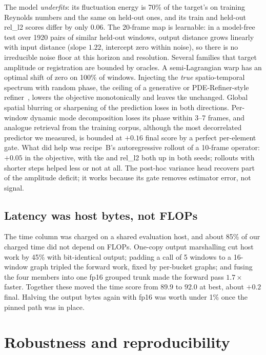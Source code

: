 \documentclass[10pt]{article}
\begin{document}
The model \emph{underfits}: its fluctuation energy is 70\% of the target's on training Reynolds numbers and the same on held-out ones, and its train and held-out rel\_l2 scores differ by only $0.06$. The 20-frame map is learnable: in a model-free test over 1920 pairs of similar held-out windows, output distance grows linearly with input distance (slope $1.22$, intercept zero within noise), so there is no irreducible noise floor at this horizon and resolution. Several families that target amplitude or registration are bounded by oracles. A semi-Lagrangian warp has an optimal shift of zero on 100\% of windows. Injecting the \emph{true} spatio-temporal spectrum with random phase, the ceiling of a generative or PDE-Refiner-style refiner~\citep{lippe2023pderefiner}, lowers the objective monotonically and leaves tke unchanged. Global spatial blurring or sharpening of the prediction loses in both directions. Per-window dynamic mode decomposition loses its phase within 3--7 frames, and analogue retrieval from the training corpus, although the most decorrelated predictor we measured, is bounded at $+0.16$ final score by a perfect per-element gate. What did help was recipe~B's autoregressive rollout of a 10-frame operator: $+0.05$ in the objective, with tke and rel\_l2 both up in both seeds; rollouts with shorter steps helped less or not at all. The post-hoc variance head recovers part of the amplitude deficit; it works because its gate removes estimator error, not signal.

\subsection{Latency was host bytes, not FLOPs}

The time column was charged on a shared evaluation host, and about 85\% of our charged time did not depend on FLOPs. One-copy output marshalling cut host work by 45\% with bit-identical output; padding a call of 5 windows to a 16-window graph tripled the forward work, fixed by per-bucket graphs; and fusing the four members into one fp16 grouped trunk made the forward pass $1.7\times$ faster. Together these moved the time score from $89.9$ to $92.0$ at best, about $+0.2$ final. Halving the output bytes again with fp16 was worth under 1\% once the pinned path was in place.

\section{Robustness and reproducibility}
\end{document}
